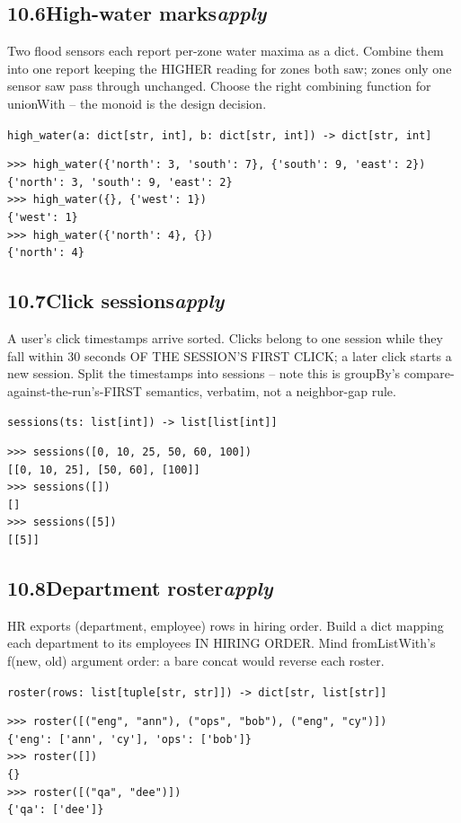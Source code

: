 \documentclass[10pt,letterpaper]{book}
\begin{document}
\subsection*{10.6\quad High-water marks\hfill\textnormal{\textit{apply}}}
Two flood sensors each report per-zone water maxima as a dict. Combine them into one report keeping the HIGHER reading for zones both saw; zones only one sensor saw pass through unchanged. Choose the right combining function for unionWith -- the monoid is the design decision.

\noindent\texttt{high\_water(a: dict[str, int], b: dict[str, int]) -> dict[str, int]}
\begin{lstlisting}[style=ex]
>>> high_water({'north': 3, 'south': 7}, {'south': 9, 'east': 2})
{'north': 3, 'south': 9, 'east': 2}
>>> high_water({}, {'west': 1})
{'west': 1}
>>> high_water({'north': 4}, {})
{'north': 4}
\end{lstlisting}
\subsection*{10.7\quad Click sessions\hfill\textnormal{\textit{apply}}}
A user's click timestamps arrive sorted. Clicks belong to one session while they fall within 30 seconds OF THE SESSION'S FIRST CLICK; a later click starts a new session. Split the timestamps into sessions -- note this is groupBy's compare-against-the-run's-FIRST semantics, verbatim, not a neighbor-gap rule.

\noindent\texttt{sessions(ts: list[int]) -> list[list[int]]}
\begin{lstlisting}[style=ex]
>>> sessions([0, 10, 25, 50, 60, 100])
[[0, 10, 25], [50, 60], [100]]
>>> sessions([])
[]
>>> sessions([5])
[[5]]
\end{lstlisting}
\subsection*{10.8\quad Department roster\hfill\textnormal{\textit{apply}}}
HR exports (department, employee) rows in hiring order. Build a dict mapping each department to its employees IN HIRING ORDER. Mind fromListWith's f(new, old) argument order: a bare concat would reverse each roster.

\noindent\texttt{roster(rows: list[tuple[str, str]]) -> dict[str, list[str]]}
\begin{lstlisting}[style=ex]
>>> roster([("eng", "ann"), ("ops", "bob"), ("eng", "cy")])
{'eng': ['ann', 'cy'], 'ops': ['bob']}
>>> roster([])
{}
>>> roster([("qa", "dee")])
{'qa': ['dee']}
\end{lstlisting}
\end{document}
